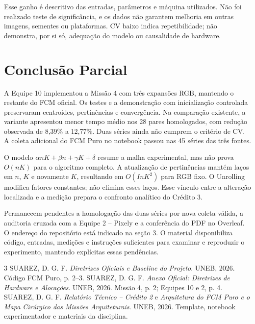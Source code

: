 \documentclass[11pt,a4paper]{article}
\begin{document}
Esse ganho é descritivo das entradas, parâmetros e máquina utilizados.
Não foi realizado teste de significância, e os dados não garantem melhoria
em outras imagens, sementes ou plataformas. CV baixo indica repetibilidade;
não demonstra, por si só, adequação do modelo ou causalidade de hardware.

\clearpage
\section{Conclusão Parcial}
A Equipe 10 implementou a Missão 4 com três expansões RGB, mantendo o restante
do FCM oficial. Os testes e a demonstração com inicialização controlada
preservaram centroides, pertinências e convergência. Na comparação existente,
a variante apresentou menor tempo médio nos 28 pares homologados, com redução
observada de 8,39\% a 12,77\%. Duas séries ainda não cumprem o critério de CV.
A coleta adicional do FCM Puro no notebook passou nas 45 séries das três fontes.

O modelo $\alpha nK+\beta n+\gamma K+\delta$ resume a malha experimental,
mas não prova $O(nK)$ para o algoritmo completo. A atualização de pertinências
mantém laços em $n$, $K$ e novamente $K$, resultando em $O(InK^2)$ para RGB
fixo. O Unrolling modifica fatores constantes; não elimina esses laços.
Esse vínculo entre a alteração localizada e a medição prepara o confronto
analítico do Crédito 3.

Permanecem pendentes a homologação das duas séries por nova coleta válida,
a auditoria cruzada com a Equipe 2 -- Pixely e a conferência do PDF no
Overleaf. O endereço do repositório está indicado na seção 3.
O material disponibiliza código, entradas, medições e instruções suficientes
para examinar e reproduzir o experimento, mantendo explícitas essas pendências.

\begin{thebibliography}{3}
 SUAREZ, D. G. F. \textit{Diretrizes Oficiais e Baseline do Projeto}.
UNEB, 2026. Código FCM Puro, p. 2--3.
 SUAREZ, D. G. F. \textit{Anexo Oficial: Diretrizes de Hardware e Alocações}.
UNEB, 2026. Missão 4, p. 2; Equipes 10 e 2, p. 4.
 SUAREZ, D. G. F. \textit{Relatório Técnico -- Crédito 2} e
\textit{Arquitetura do FCM Puro e o Mapa Cirúrgico das Missões Arquiteturais}.
UNEB, 2026. Template, notebook experimentador e materiais da disciplina.
\end{thebibliography}
\end{document}
